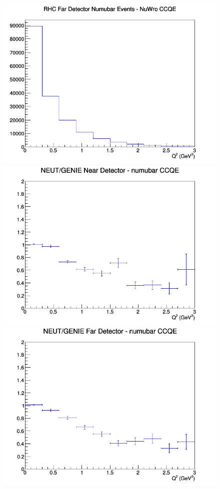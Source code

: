 \begin{figure}[h]
\endminipage
{}
\includegraphics[width=\linewidth]{eff_Q2/LAr/CCQE_RHC_FD_numubar_Q2_NuWro.png}
\endminipage
\newline
{}
\includegraphics[width=\linewidth]{eff_Q2/LAr/ratios/CCQE_NEUT_GENIE_numubar_near_Q2.png}
\endminipage
{}
\includegraphics[width=\linewidth]{eff_Q2/LAr/ratios/CCQE_NEUT_GENIE_numubar_far_Q2.png}

\end{figure}
